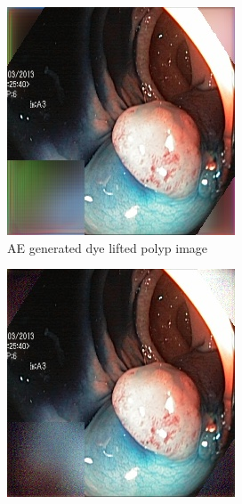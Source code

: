 \begin{figure}[h]
\begin{subfigure}[t]{\myfigsizethree}
            \includegraphics[width=\textwidth]{experiments/figures/both/DLAE.jpg}
            \caption{AE generated dye lifted polyp image}    
            \label{fig:dlp_AE_BOTH2}
        \end{subfigure}
        \qquad
        \begin{subfigure}[t]{\myfigsizethree}  
            \centering 
            \includegraphics[width=\textwidth]{experiments/figures/both/DLGAN.jpg}

\end{subfigure}
\end{figure}
